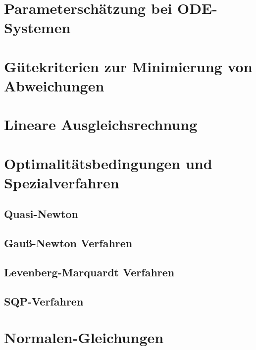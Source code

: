     \section{Parameterschätzung bei ODE-Systemen} %

    \section{Gütekriterien zur Minimierung von Abweichungen} %

    \section{Lineare Ausgleichsrechnung} %

    \section{Optimalitätsbedingungen und Spezialverfahren} %

        \subsection{Quasi-Newton} %

        \subsection{Gauß-Newton Verfahren} %

        \subsection{Levenberg-Marquardt Verfahren} %

        \subsection{SQP-Verfahren} %

    \section{Normalen-Gleichungen} %

